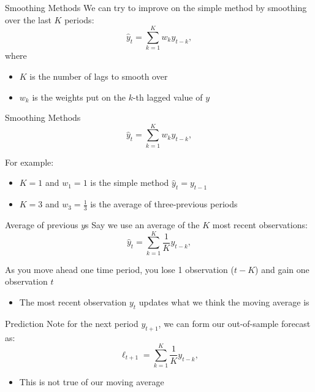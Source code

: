 \documentclass[aspectratio=169,t,11pt,table]{beamer}
\begin{document}
\begin{frame}{Smoothing Methods}
  We can try to improve on the simple method by smoothing over the last $K$ periods:
  $$
    \hat{y}_t = \sum_{k=1}^K w_k y_{t - k},
  $$
  where 
  \begin{itemize}
    \item $K$ is the number of lags to smooth over
    \item $w_k$ is the weights put on the $k$-th lagged value of $y$
  \end{itemize}
\end{frame}

\begin{frame}{Smoothing Methods}
  \vspace*{-\bigskipamount}
  $$
    \hat{y}_t = \sum_{k=1}^K w_k y_{t - k},
  $$
  
  \bigskip
  For example: 
  \begin{itemize}
    \item $K = 1$ and $w_1 = 1$ is the simple method $\hat{y}_t = y_{t-1}$
    
    \pause
    \item $K = 3$ and $w_3 = \frac{1}{3}$ is the average of three-previous periods
  \end{itemize}
\end{frame}

\begin{frame}{Average of previous $y$s}
  Say we use an average of the $K$ most recent observations:
  $$
    \hat{y}_t = \sum_{k=1}^K \frac{1}{K} y_{t - k},
  $$

  \pause
  \bigskip
  As you move ahead one time period, you lose 1 observation ($t - K$) and gain one observation $t$
  \begin{itemize}
    \item The most recent observation $y_t$ updates what we think the moving average is
  \end{itemize}
\end{frame}


\begin{frame}{Prediction}
  Note for the next period $y_{t+1}$, we can form our out-of-sample forecast as:
  $$
    \ell_{t+1} = \sum_{k=1}^K \frac{1}{K} y_{t - k},
  $$
  \begin{itemize}
    \item This is not true of our moving average
  \end{itemize}
\end{frame}
\end{document}

